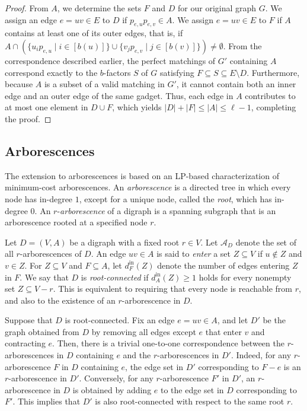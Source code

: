 \documentclass{article}
\theoremstyle{plain}
\theoremstyle{definition}
\begin{document}
\begin{proof}
    From $A$, we determine the sets $F$ and $D$ for our original graph $G$. We assign an edge $e = uv \in E$ to $D$ if $p_{e, u}p_{e, v} \in A$. We assign $e = uv \in E$ to $F$ if $A$ contains at least one of its outer edges, that is, if $A \cap (\{u_{i}p_{e, u} \mid i \in [b(u)]\} \cup \{v_{j}p_{e, v} \mid j \in [b(v)]\}) \neq \emptyset$. From the correspondence described earlier, the perfect matchings of $G'$ containing $A$ correspond exactly to the $b$-factors $S$ of $G$ satisfying $F \subseteq S \subseteq E \setminus D$. Furthermore, because $A$ is a subset of a valid matching in $G'$, it cannot contain both an inner edge and an outer edge of the same gadget. Thus, each edge in $A$ contributes to at most one element in $D \cup F$, which yields $|D|+|F| \leq |A| \leq \ell-1$, completing the proof.
\end{proof}

\subsection{Arborescences}
\label{sec:arbs}

The extension to arborescences is based on an LP-based characterization of minimum-cost arborescences.
An \textit{arborescence} is a directed tree in which every node has in-degree $1$, except for a unique node, called the \textit{root}, which has in-degree $0$. An $r$-\textit{arborescence} of a digraph is a spanning subgraph that is an arborescence rooted at a specified node $r$.

Let $D=(V,A)$ be a digraph with a fixed root $r \in V$. Let $\mathcal{A}_{D}$ denote the set of all $r$-arborescences of $D$. An edge $uv \in A$ is said to \textit{enter} a set $Z \subseteq V$ if $u \notin Z$ and $v \in Z$. For $Z \subseteq V$ and $F\subseteq A$, let $d^\mathrm{in}_F(Z)$ denote the number of edges entering $Z$ in $F$. We say that $D$ is \textit{root-connected} if $d^\mathrm{in}_A(Z) \ge 1$ holds for every nonempty set $Z \subseteq V - {r}$. This is equivalent to requiring that every node is reachable from $r$, and also to the existence of an $r$-arborescence in $D$.

Suppose that $D$ is root-connected.
Fix an edge $e = uv \in A$, and let $D'$ be the graph obtained from $D$ by removing all edges except $e$ that enter $v$ and contracting $e$.
Then, there is a trivial one-to-one correspondence between the $r$-arborescences in $D$ containing $e$ and the $r$-arborescences in $D'$.
Indeed, for any $r$-arborescence $F$ in $D$ containing $e$, the edge set in $D'$ corresponding to $F - e$ is an $r$-arborescence in $D'$.
Conversely, for any $r$-arborescence $F'$ in $D'$, an $r$-arborescence in $D$ is obtained by adding $e$ to the edge set in $D$ corresponding to $F'$.
This implies that $D'$ is also root-connected with respect to the same root $r$.
\end{document}
